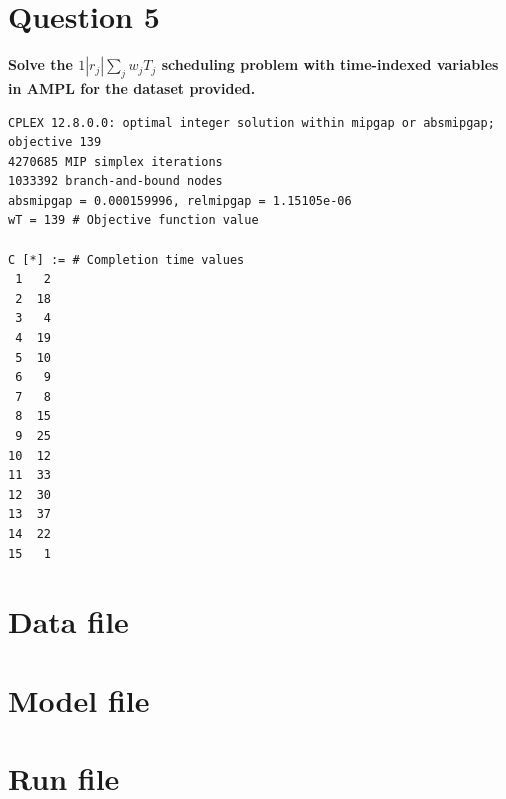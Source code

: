 \documentclass[a4paper, fleqn]{article}
\begin{document}
\section{Question 5}
\textbf{Solve the $1|r_j|\sum_jw_jT_j$ scheduling problem with time-indexed variables in AMPL for the dataset provided.}
\begin{lstlisting}[language=AMPL]
CPLEX 12.8.0.0: optimal integer solution within mipgap or absmipgap; objective 139
4270685 MIP simplex iterations
1033392 branch-and-bound nodes
absmipgap = 0.000159996, relmipgap = 1.15105e-06
wT = 139 # Objective function value

C [*] := # Completion time values
 1   2
 2  18
 3   4
 4  19
 5  10
 6   9
 7   8
 8  15
 9  25
10  12
11  33
12  30
13  37
14  22
15   1
\end{lstlisting}
\pagebreak
\begin{appendix}
\section{Data file}

\section{Model file}

\section{Run file}

\end{appendix}
\end{document}
